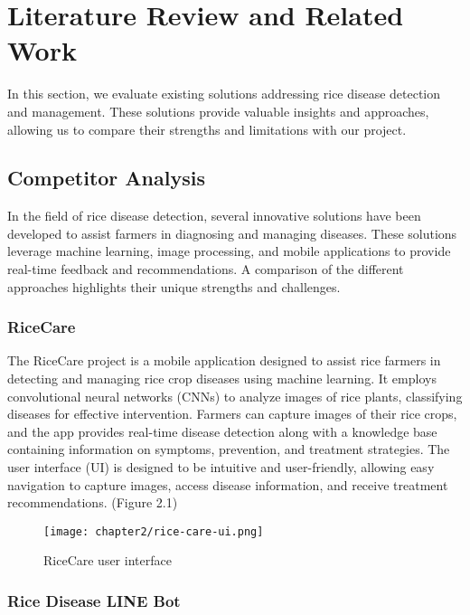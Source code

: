 \chapter{Literature Review and Related Work}
\label{chap:relatedworks}

In this section, we evaluate existing solutions addressing rice disease detection and management. These solutions provide valuable insights and approaches, allowing us to compare their strengths and limitations with our project.

\vspace*{.2in}
\section{Competitor Analysis}
\label{section:competitor-analysis}


In the field of rice disease detection, several innovative solutions have been developed to assist farmers in diagnosing and managing diseases. These solutions leverage machine learning, image processing, and mobile applications to provide real-time feedback and recommendations. A comparison of the different approaches highlights their unique strengths and challenges.

\subsection{RiceCare}
\label{subsection:ricecare}

The RiceCare project is a mobile application designed to assist rice farmers in detecting and managing rice crop diseases using machine learning. It employs convolutional neural networks (CNNs) to analyze images of rice plants, classifying diseases for effective intervention. Farmers can capture images of their rice crops, and the app provides real-time disease detection along with a knowledge base containing information on symptoms, prevention, and treatment strategies. The user interface (UI) is designed to be intuitive and user-friendly, allowing easy navigation to capture images, access disease information, and receive treatment recommendations. (Figure 2.1)

\begin{figure}[h]
    \centering
    \texttt{[image: chapter2/rice-care-ui.png]}
    \caption{RiceCare user interface}
\end{figure}

\subsection{Rice Disease LINE Bot}
\label{subsection:rice-disease-line-bot}


